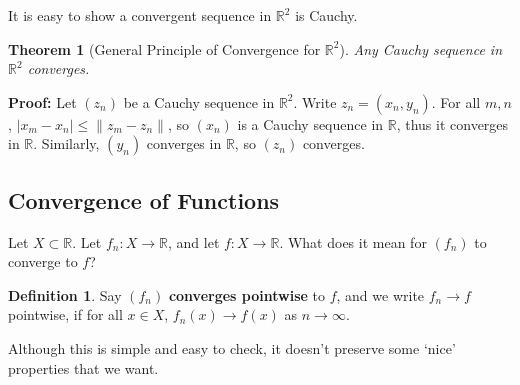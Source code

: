 \documentclass[12pt]{article}
\newtheorem{theorem}{Theorem}[section]
\theoremstyle{definition}
\newtheorem{definition}{Definition}[section]
\theoremstyle{remark}
\begin{document}
It is easy to show a convergent sequence in $\mathbb{R}^2$ is Cauchy.

\begin{theorem}[General Principle of Convergence for $\mathbb{R}^2$]
\item
	Any Cauchy sequence in $\mathbb{R}^2$ converges.
\end{theorem}

\begin{adjustbox}{minipage = \columnwidth - 25.5pt, margin=1em, frame=1pt, margin=0em}
	\textbf{Proof:} Let $(z_n)$ be a Cauchy sequence in $\mathbb{R}^2$. Write $z_n = (x_n, y_n)$. For all $m, n$, $|x_m - x_n| \leq \|z_m - z_n\|$, so $(x_n)$ is a Cauchy sequence in $\mathbb{R}$, thus it converges in $\mathbb{R}$. Similarly, $(y_n)$ converges in $\mathbb{R}$, so $(z_n)$ converges.
\end{adjustbox}

\subsection{Convergence of Functions}%
\label{sub:convergence_of_functions}

Let $X \subset \mathbb{R}$. Let $f_n : X \to \mathbb{R}$, and let $f : X \to \mathbb{R}$. What does it mean for $(f_n)$ to converge to $f$?

\begin{definition}
	Say $(f_n)$ \textbf{converges pointwise} to $f$, and we write $f_n \to f$ pointwise, if for all $x \in X$, $f_n(x) \to f(x)$ as $n \to \infty$.
\end{definition}

Although this is simple and easy to check, it doesn't preserve some `nice' properties that we want.
\end{document}
